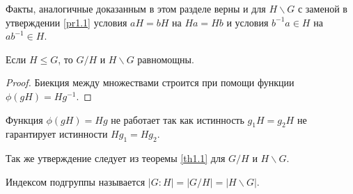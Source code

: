 \begin{note}
    Факты, аналогичные доказанным в этом разделе верны и для $H \backslash G$ с заменой в 
    утверждении \ref{pr1.1} условия $aH = bH$ на $Ha = Hb$ и 
    условия $b^{-1}a \in H$ на $ab^{-1} \in H$.
\end{note}

\begin{proposition}
    Если $H \leq G$, то $G / H$ и $H \backslash G$ равномощны. 
\end{proposition}

\begin{proof}
    Биекция между множествами строится при помощи функции $\phi(gH) = Hg^{-1}$.
\end{proof}

\begin{note}
    Функция $\phi(gH) = Hg$ не работает так как истинность $g_1 H = g_2 H$ не гарантирует 
    истинности $H g_1 = H g_2$.
\end{note}

\begin{remarkfrom}
    Так же утверждение следует из теоремы \ref{th1.1} для $G / H$ и $H \backslash G$.
\end{remarkfrom}

\begin{definition}
    Индексом подгруппы называется $|G:H| = |G / H| = |H \backslash G|$.
\end{definition}